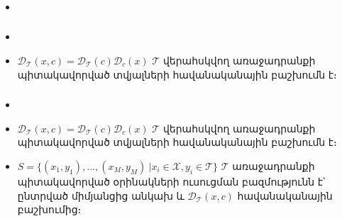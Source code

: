 \documentclass[10pt]{beamer}
\begin{document}
\begin{frame}[t]
\frametitle{}
\begin{itemize}
\vspace{5mm}
\item  {}
\end{itemize}
\end{frame}



\begin{frame}[t]
\frametitle{}
\begin{itemize}
\vspace{5mm}
\item  {}

\item $\mathcal{D}_{\mathcal{T}}(x, c) = \mathcal{D}_{\mathcal{T}}(c)\mathcal{D}_{c}(x)$ $\mathcal{T}$ վերահսկվող առաջադրանքի պիտակավորված տվյալների հավանականային բաշխումն է։

\end{itemize}
\end{frame}



\begin{frame}[t]
\frametitle{}
\begin{itemize}
\vspace{5mm}
\item  {}

\item $\mathcal{D}_{\mathcal{T}}(x, c) = \mathcal{D}_{\mathcal{T}}(c)\mathcal{D}_{c}(x)$ $\mathcal{T}$ վերահսկվող առաջադրանքի պիտակավորված տվյալների հավանականային բաշխումն է։

\item $S = \{(x_1, y_1), ..., (x_M, y_M) \ | x_i \in \mathcal{X}, y_i \in \mathcal{T}\}$ $\mathcal{T}$ առաջադրանքի պիտակավորված օրինակների ուսուցման բազմությունն է՝ ընտրված միմյանցից անկախ և $\mathcal{D}_{\mathcal{T}}(x, c)$ հավանականային բաշխումից։
\end{itemize}
\end{frame}

\subsection{}
\end{document}
